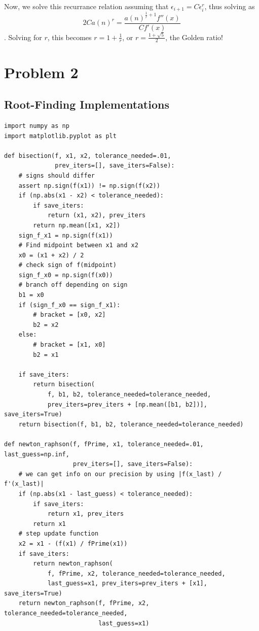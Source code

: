 \documentclass[11pt]{article}
\begin{document}
Now, we solve this recurrance relation assuming that $\epsilon _{i+1}=C
\epsilon _i^r$, thus solving as $$2 C a(n)^r=\frac{a(n)^{\frac{1}{r}+1}
f''(x)}{C f'(x)}$$. Solving for $r$, this becomes $r = 1 + \frac{1}{r}$, or $r
= \frac{1 + \sqrt{5}}{2}$, the Golden ratio!


\section*{Problem 2}
\label{sec-2}

\subsection*{Root-Finding Implementations}
\label{sec-2-1}

\begin{verbatim}
import numpy as np
import matplotlib.pyplot as plt

def bisection(f, x1, x2, tolerance_needed=.01, 
              prev_iters=[], save_iters=False):
    # signs should differ
    assert np.sign(f(x1)) != np.sign(f(x2))
    if (np.abs(x1 - x2) < tolerance_needed):
        if save_iters:
            return (x1, x2), prev_iters
        return np.mean([x1, x2])
    sign_f_x1 = np.sign(f(x1))
    # Find midpoint between x1 and x2 
    x0 = (x1 + x2) / 2
    # check sign of f(midpoint)
    sign_f_x0 = np.sign(f(x0))
    # branch off depending on sign
    b1 = x0
    if (sign_f_x0 == sign_f_x1):
        # bracket = [x0, x2]
        b2 = x2
    else:
        # bracket = [x1, x0]
        b2 = x1
        
    if save_iters:
        return bisection(
            f, b1, b2, tolerance_needed=tolerance_needed,
            prev_iters=prev_iters + [np.mean([b1, b2])], save_iters=True)
    return bisection(f, b1, b2, tolerance_needed=tolerance_needed)

def newton_raphson(f, fPrime, x1, tolerance_needed=.01, last_guess=np.inf,
                   prev_iters=[], save_iters=False):
    # we can get info on our precision by using |f(x_last) / f'(x_last)|
    if (np.abs(x1 - last_guess) < tolerance_needed):
        if save_iters:
            return x1, prev_iters
        return x1
    # step update function
    x2 = x1 - (f(x1) / fPrime(x1))
    if save_iters:
        return newton_raphson(
            f, fPrime, x2, tolerance_needed=tolerance_needed,
            last_guess=x1, prev_iters=prev_iters + [x1], save_iters=True)
    return newton_raphson(f, fPrime, x2, tolerance_needed=tolerance_needed,
                          last_guess=x1)


\end{verbatim}
\end{document}
